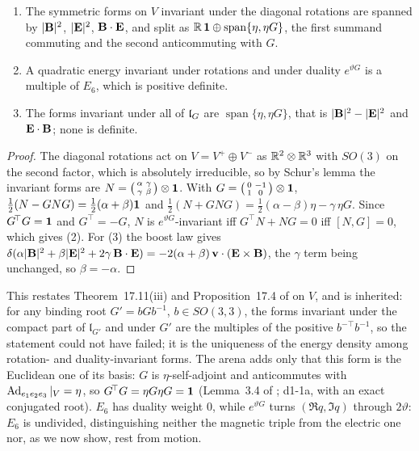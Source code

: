 \begin{theorem}
\label{d1:thm:unique}
\begin{enumerate}
\item The symmetric forms on $V$ invariant under the diagonal rotations are spanned by $|\mathbf B|^2$, $|\mathbf E|^2$, $\mathbf B\cdot\mathbf E$, and split as
$\mathbb{R}\,\mathbf 1\oplus\operatorname{span}\{\eta,\eta G\}$, the first summand commuting and the second anticommuting with $G$.
\item A quadratic energy invariant under rotations and under duality $e^{\vartheta G}$ is a multiple of $E_6$, which is positive definite.
\item The forms invariant under all of $\mathfrak l_G$ are $\operatorname{span}\{\eta,\eta G\}$, that is $|\mathbf B|^2-|\mathbf E|^2$ and $\mathbf E\cdot\mathbf B$; none is definite.
\end{enumerate}
\end{theorem}

\begin{proof}
The diagonal rotations act on $V=V^+\oplus V^-$ as $\mathbb{R}^2\otimes\mathbb{R}^3$ with $SO(3)$ on the second factor, which is absolutely irreducible, so by
Schur's lemma \cite{Schur} the invariant forms are $N=\bigl(\begin{smallmatrix}\alpha&\gamma\\ \gamma&\beta\end{smallmatrix}\bigr)\otimes\mathbf 1$.
With $G=\bigl(\begin{smallmatrix}0&-1\\1&0\end{smallmatrix}\bigr)\otimes\mathbf 1$, $\tfrac12(N-GNG)=\tfrac12(\alpha+\beta)\mathbf 1$ and
$\tfrac12(N+GNG)=\tfrac12(\alpha-\beta)\eta-\gamma\,\eta G$. Since $G^{\!\top}G=\mathbf 1$ and $G^{\!\top}=-G$, $N$ is $e^{\vartheta G}$-invariant iff
$G^{\!\top}N+NG=0$ iff $[N,G]=0$, which gives (2). For (3) the boost law gives
$\delta(\alpha|\mathbf B|^2+\beta|\mathbf E|^2+2\gamma\,\mathbf B\cdot\mathbf E)=-2(\alpha+\beta)\,\mathbf v\cdot(\mathbf E\times\mathbf B)$, the $\gamma$ term being unchanged, so $\beta=-\alpha$.
\end{proof}

This restates Theorem~17.11(iii) and Proposition~17.4 of \cite{ES17} on $V$, and is inherited: for any binding root $G'=bGb^{-1}$, $b\in SO(3,3)$,
the forms invariant under the compact part of $\mathfrak l_{G'}$ and under $G'$ are the multiples of the positive $b^{-\top}b^{-1}$, so the statement
could not have failed; it is the uniqueness of the energy density among rotation- and duality-invariant forms. The arena adds only that this form
is the Euclidean one of its basis: $G$ is $\eta$-self-adjoint and anticommutes with $\operatorname{Ad}_{e_1e_2e_3}|_V=\eta$, so $G^{\!\top}G=\eta G\eta G=\mathbf 1$
(Lemma~3.4 of \cite{ES17}; d1-1a, with an exact conjugated root). $E_6$ has duality weight $0$, while $e^{\vartheta G}$ turns $(\Re q,\Im q)$ through
$2\vartheta$: $E_6$ is undivided, distinguishing neither the magnetic triple from the electric one nor, as we now show, rest from motion.

